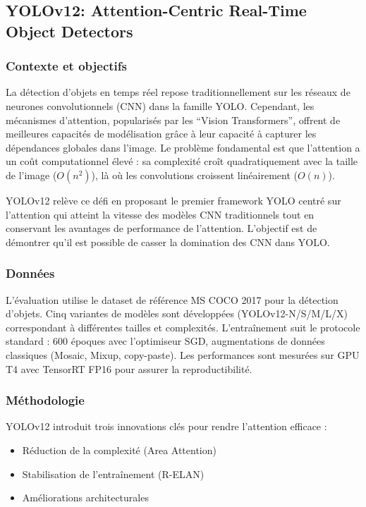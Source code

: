 \subsection{YOLOv12: Attention-Centric Real-Time Object Detectors}

\subsubsection{Contexte et objectifs}
La détection d'objets en temps réel repose traditionnellement sur les réseaux de neurones convolutionnels (CNN) dans la famille YOLO. Cependant, les mécanismes d'attention, popularisés par les ``Vision Transformers'', offrent de meilleures capacités de modélisation grâce à leur capacité à capturer les dépendances globales dans l'image. Le problème fondamental est que l'attention a un coût computationnel élevé : sa complexité croît quadratiquement avec la taille de l'image ($O(n^2)$), là où les convolutions croissent linéairement ($O(n)$). 

YOLOv12 relève ce défi en proposant le premier framework YOLO centré sur l'attention qui atteint la vitesse des modèles CNN traditionnels tout en conservant les avantages de performance de l'attention. L'objectif est de démontrer qu'il est possible de casser la domination des CNN dans YOLO.

\subsubsection{Données}
L'évaluation utilise le dataset de référence MS COCO 2017 pour la détection d'objets. Cinq variantes de modèles sont développées (YOLOv12-N/S/M/L/X) correspondant à différentes tailles et complexités. L'entraînement suit le protocole standard : 600 époques avec l'optimiseur SGD, augmentations de données classiques (Mosaic, Mixup, copy-paste). Les performances sont mesurées sur GPU T4 avec TensorRT FP16 pour assurer la reproductibilité.
\cite{}
\subsubsection{Méthodologie}
YOLOv12 introduit trois innovations clés pour rendre l'attention efficace :
\begin{itemize}
    \item Réduction de la complexité (Area Attention)
    \item Stabilisation de l'entraînement (R-ELAN)
    \item Améliorations architecturales
\end{itemize}

